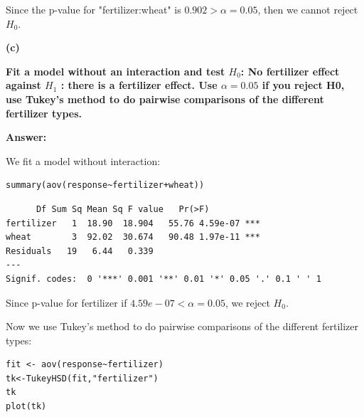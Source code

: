 \documentclass[letterpaper,11pt]{article}
\begin{document}
Since the p-value for "fertilizer:wheat" is $0.902>\alpha = 0.05$, then we cannot reject $H_0$.

\bigbreak
\begin{addmargin}[-1.1em]{0em}
\textbf{(c)}\par\end{addmargin}
\textbf{Fit a model without an interaction and test $H_0$: No fertilizer effect against $H_1$ : there is a fertilizer effect. Use $\alpha = 0.05$ if you reject H0, use Tukey’s method to do pairwise comparisons of the different fertilizer types.}\par
    \bigbreak
    \begin{addmargin}[-0.5em]{0em}
    \textbf{Answer: }\end{addmargin}
We fit a model without interaction:
\begin{lstlisting}
summary(aov(response~fertilizer+wheat))
\end{lstlisting}

\begin{lstlisting}
      Df Sum Sq Mean Sq F value   Pr(>F)
fertilizer   1  18.90  18.904   55.76 4.59e-07 ***
wheat        3  92.02  30.674   90.48 1.97e-11 ***
Residuals   19   6.44   0.339
---
Signif. codes:  0 '***' 0.001 '**' 0.01 '*' 0.05 '.' 0.1 ' ' 1
\end{lstlisting}

Since p-value for fertilizer if $4.59e-07<\alpha = 0.05$, we reject $H_0$.\par
Now we use Tukey's method to do pairwise comparisons of the different fertilizer types:

\begin{lstlisting}
fit <- aov(response~fertilizer)
tk<-TukeyHSD(fit,"fertilizer")
tk
plot(tk)
\end{lstlisting}

\begin{center}
\end{center}
\end{document}
